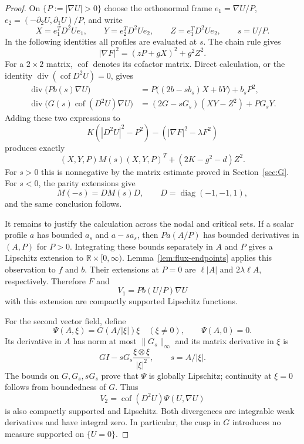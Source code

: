 \documentclass[11pt]{article}
\theoremstyle{remark}
\DeclareMathOperator{\cof}{cof}
\begin{document}
\begin{proof}
On $\{P:=|\nabla U|>0\}$ choose the orthonormal frame
$e_1=\nabla U/P$, $e_2=(-\partial_2U,\partial_1U)/P$, and write
\[
 X=e_1^TD^2Ue_1,\qquad Y=e_2^TD^2Ue_2,
 \qquad Z=e_1^TD^2Ue_2,\qquad s=U/P.
\]
In the following identities all profiles are evaluated at $s$.
The chain rule gives
\[
 |\nabla F|^2=(zP+gX)^2+g^2Z^2.
\]
For a $2\times2$ matrix, $\cof$ denotes its cofactor matrix. Direct
calculation, or the identity $\operatorname{div}(\cof D^2U)=0$, gives
\begin{align*}
 \operatorname{div}\bigl(Pb(s)\nabla U\bigr)
   &=P\bigl((2b-sb_s)X+bY\bigr)+b_sP^2,\\
 \operatorname{div}\bigl(G(s)\cof(D^2U)\nabla U\bigr)
   &=(2G-sG_s)(XY-Z^2)+PG_sY.
\end{align*}
Adding these two expressions to
\[
 K(|D^2U|^2-P^2)-(|\nabla F|^2-\lambda F^2)
\]
produces exactly
\[
 (X,Y,P)M(s)(X,Y,P)^T+(2K-g^2-d)Z^2.
\]
For $s>0$ this is nonnegative by the matrix estimate proved in
Section~\ref{sec:G}. For $s<0$, the parity extensions give
\[
 M(-s)=D M(s)D,\qquad D=\operatorname{diag}(-1,-1,1),
\]
and the same conclusion follows.

It remains to justify the calculation across the nodal and critical
sets. If a scalar profile $a$ has bounded $a_s$ and $a-sa_s$, then
$P a(A/P)$ has bounded derivatives in $(A,P)$ for $P>0$. Integrating
these bounds separately in $A$ and $P$ gives a Lipschitz extension to
$\mathbb R\times[0,\infty)$. Lemma~\ref{lem:flux-endpoints} applies
this observation to $f$ and $b$. Their extensions at $P=0$ are
$\ell|A|$ and $2\lambda\ell A$, respectively. Therefore $F$ and
\[
 V_1=P b(U/P)\nabla U
\]
with this extension are compactly supported Lipschitz functions.

For the second vector field, define
\[
 \Psi(A,\xi)=G(A/|\xi|)\xi\quad(\xi\ne0),\qquad
 \Psi(A,0)=0.
\]
Its derivative in $A$ has norm at most $\|G_s\|_\infty$ and its
matrix derivative in $\xi$ is
\[
 G I-sG_s\frac{\xi\otimes\xi}{|\xi|^2},\qquad s=A/|\xi|.
\]
The bounds on $G,G_s,sG_s$ prove that $\Psi$ is globally Lipschitz;
continuity at $\xi=0$ follows from boundedness of $G$. Thus
\[
 V_2=\cof(D^2U)\Psi(U,\nabla U)
\]
is also compactly supported and Lipschitz. Both divergences are
integrable weak derivatives and have integral zero. In particular,
the cusp in $G$ introduces no measure supported on $\{U=0\}$.


\end{proof}
\end{document}
